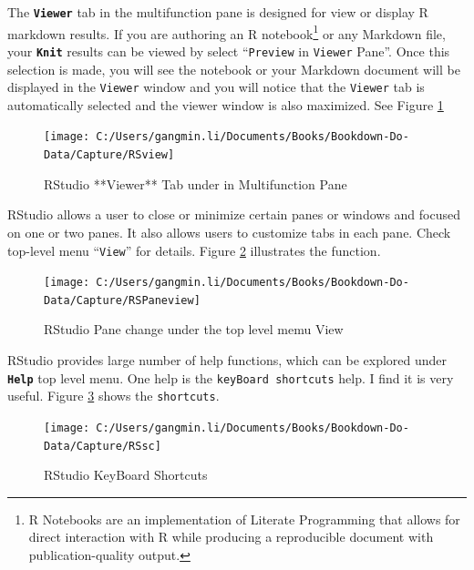\documentclass[
]{book}
\begin{document}
The \textbf{\texttt{Viewer}} tab in the multifunction pane is designed for view or display R markdown results. If you are authoring an R notebook\footnote{R Notebooks are an implementation of Literate Programming that allows for direct interaction with R while producing a reproducible document with publication-quality output.} or any Markdown file, your \textbf{\texttt{Knit}} results can be viewed by select ``\texttt{Preview} in \texttt{Viewer} Pane''. Once this selection is made, you will see the notebook or your Markdown document will be displayed in the \texttt{Viewer} window and you will notice that the \texttt{Viewer} tab is automatically selected and the viewer window is also maximized. See Figure \ref{fig:SSview}

\begin{figure}

{\centering \texttt{[image: C:/Users/gangmin.li/Documents/Books/Bookdown-Do-Data/Capture/RSview]} 

}

\caption{RStudio **Viewer** Tab under in Multifunction Pane}\label{fig:SSview}
\end{figure}

RStudio allows a user to close or minimize certain panes or windows and focused on one or two panes. It also allows users to customize tabs in each pane. Check top-level menu ``\texttt{View}'' for details. Figure \ref{fig:RSview} illustrates the function.

\begin{figure}

{\centering \texttt{[image: C:/Users/gangmin.li/Documents/Books/Bookdown-Do-Data/Capture/RSPaneview]} 

}

\caption{RStudio Pane change under the top level memu View}\label{fig:RSview}
\end{figure}

RStudio provides large number of help functions, which can be explored under \textbf{\texttt{Help}} top level menu. One help is the \texttt{keyBoard\ shortcuts} help. I find it is very useful. Figure \ref{fig:rssc} shows the \texttt{shortcuts}.

\begin{figure}

{\centering \texttt{[image: C:/Users/gangmin.li/Documents/Books/Bookdown-Do-Data/Capture/RSsc]} 

}

\caption{RStudio KeyBoard Shortcuts}\label{fig:rssc}
\end{figure}
\end{document}

